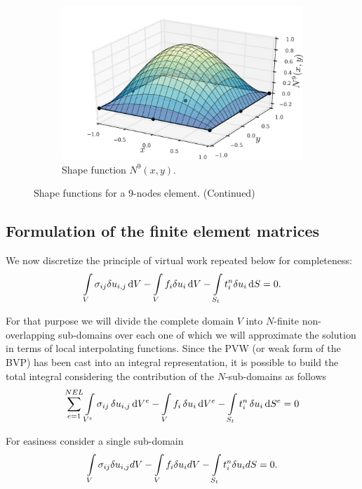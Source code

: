 \begin{figure}
\begin{subfigure}[b]{0.45\textwidth}
		\includegraphics[width=\textwidth]{shape_func-9-nodes-9.pdf}
		\caption{Shape function $N^9(x,y)$.}
	\end{subfigure}
\caption{Shape functions for a 9-nodes element. (Continued)}
\end{figure}

\subsection{Formulation of the finite element matrices}
We now discretize the principle of virtual work repeated below for completeness:
\begin{equation} \label{pvw_2}
\int\limits_V \sigma_{ij} \delta u_{i,j} \dd{V} - \int\limits_V f_i \delta u_i \dd{V} - \int\limits_{S_t} t_i^n \delta u_i \dd{S} = 0.
\end{equation}

For that purpose we will divide the complete domain $V$ into $N$-finite non-overlapping sub-domains over each one of which we will approximate the solution in terms of local interpolating functions. Since the PVW (or weak form of the BVP) has been cast into an integral representation, it is possible to build the total integral considering the contribution of the $N$-sub-domains as follows
\begin{equation}\label{pvw_dis}
\sum_{e=1}^{NEL} \int\limits_{V^e} \sigma_{ij} \var{u}_{i,j} \dd{V^e} - \int\limits_V f_i \var{u}_i \dd{V^e} - \int\limits_{S_t} t_i^n \var{u}_i\dd{S^e} = 0 
\end{equation}

For easiness consider a single sub-domain
\begin{equation}\label{pvw_sing}
\int\limits_V \sigma_{ij} \delta u_{i,j} dV - \int\limits_V f_i\delta u_idV - \int\limits_{S_t} t_i^n \delta u_i dS = 0.
\end{equation}


